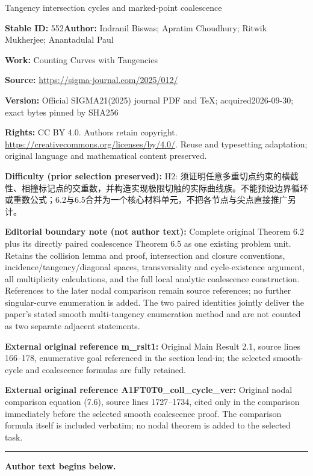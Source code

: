 \documentclass[11pt]{article}
\numberwithin{equation}{section}
\begin{document}
\begin{center}\Large Tangency intersection cycles and marked-point coalescence\end{center}
\noindent\textbf{Stable ID:} 552\quad\textbf{Author:} Indranil Biswas; Apratim Choudhury; Ritwik Mukherjee; Anantadulal Paul\par
\noindent\textbf{Work:} Counting Curves with Tangencies\par
\noindent\textbf{Source:} \url{https://sigma-journal.com/2025/012/}\par
\noindent\textbf{Version:} Official SIGMA21(2025) journal PDF and TeX; acquired2026-09-30; exact bytes pinned by SHA256\par
\noindent\textbf{Rights:} CC BY 4.0. Authors retain copyright. \url{https://creativecommons.org/licenses/by/4.0/}. Reuse and typesetting adaptation; original language and mathematical content preserved.\par
\noindent\textbf{Difficulty (prior selection preserved):} {\CJKfont H2: 须证明任意多重切点约束的横截性、相撞标记点的交重数，并构造实现极限切触的实际曲线族。不能预设边界循环或重数公式；6.2与6.5合并为一个核心材料单元，不把各节点与尖点直接推广另计。}\par
\medskip\noindent\textbf{Editorial boundary note (not author text):} Complete original Theorem 6.2 plus its directly paired coalescence Theorem 6.5 as one existing problem unit. Retains the collision lemma and proof, intersection and closure conventions, incidence/tangency/diagonal spaces, transversality and cycle-existence argument, all multiplicity calculations, and the full local analytic coalescence construction. References to the later nodal comparison remain source references; no further singular-curve enumeration is added. The two paired identities jointly deliver the paper’s stated smooth multi-tangency enumeration method and are not counted as two separate adjacent statements.\par
\noindent\textbf{External original reference m\_rslt1:} Original Main Result 2.1, source lines 166–178, enumerative goal referenced in the section lead-in; the selected smooth-cycle and coalescence formulas are fully retained.\par
\noindent\textbf{External original reference A1FT0T0\_coll\_cycle\_ver:} Original nodal comparison equation (7.6), source lines 1727–1734, cited only in the comparison immediately before the selected smooth coalescence proof. The comparison formula itself is included verbatim; no nodal theorem is added to the selected task.\par
\medskip\hrule\medskip\noindent\textbf{Author text begins below.}\par
\setcounter{section}{3}
\end{document}
